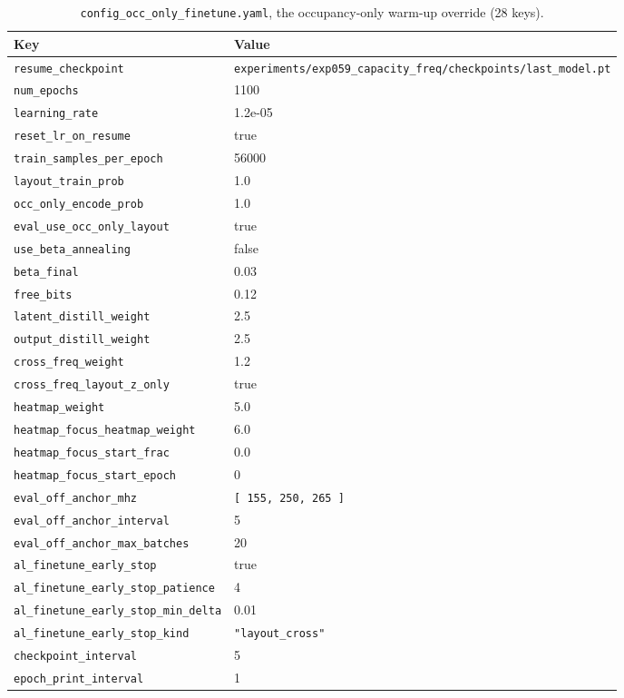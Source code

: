 \begin{table}[htbp]
\centering
\small
\caption{\texttt{config\_occ\_only\_finetune.yaml}, the occupancy-only warm-up override
(28 keys).}
\label{tab:appb_occ_warmup}
\begin{tabular}{@{}lp{}@{}}
\hline
Key & Value \\
\hline
\texttt{resume\_checkpoint} & \texttt{experiments/\allowbreak exp059\_capacity\_freq/\allowbreak checkpoints/\allowbreak last\_model.pt} \\
\texttt{num\_epochs} & 1100 \\
\texttt{learning\_rate} & 1.2e-05 \\
\texttt{reset\_lr\_on\_resume} & true \\
\texttt{train\_samples\_per\_epoch} & 56000 \\
\texttt{layout\_train\_prob} & 1.0 \\
\texttt{occ\_only\_encode\_prob} & 1.0 \\
\texttt{eval\_use\_occ\_only\_layout} & true \\
\texttt{use\_beta\_annealing} & false \\
\texttt{beta\_final} & 0.03 \\
\texttt{free\_bits} & 0.12 \\
\texttt{latent\_distill\_weight} & 2.5 \\
\texttt{output\_distill\_weight} & 2.5 \\
\texttt{cross\_freq\_weight} & 1.2 \\
\texttt{cross\_freq\_layout\_z\_only} & true \\
\texttt{heatmap\_weight} & 5.0 \\
\texttt{heatmap\_focus\_heatmap\_weight} & 6.0 \\
\texttt{heatmap\_focus\_start\_frac} & 0.0 \\
\texttt{heatmap\_focus\_start\_epoch} & 0 \\
\texttt{eval\_off\_anchor\_mhz} & \texttt{[ 155, 250, 265 ]} \\
\texttt{eval\_off\_anchor\_interval} & 5 \\
\texttt{eval\_off\_anchor\_max\_batches} & 20 \\
\texttt{al\_finetune\_early\_stop} & true \\
\texttt{al\_finetune\_early\_stop\_patience} & 4 \\
\texttt{al\_finetune\_early\_stop\_min\_delta} & 0.01 \\
\texttt{al\_finetune\_early\_stop\_kind} & \texttt{"layout\_cross"} \\
\texttt{checkpoint\_interval} & 5 \\
\texttt{epoch\_print\_interval} & 1 \\
\hline
\end{tabular}
\end{table}

